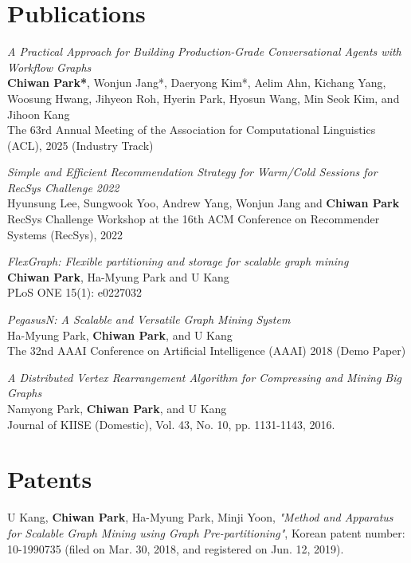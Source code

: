 \documentclass[11pt,a4paper]{article}
\renewenvironment{itemize}{
  \begin{list}{}{
    \setlength{\leftmargin}{1em}
    \setlength{\itemsep}{0.25em}
    \setlength{\parskip}{0pt}
    \setlength{\parsep}{0.25em}
  }
}{
  \end{list}
}
\begin{document}
\section*{Publications}
\begin{itemize}
  \item \textit{A Practical Approach for Building Production-Grade Conversational Agents with Workflow Graphs}\\
  \textbf{Chiwan Park*}, Wonjun Jang*, Daeryong Kim*, Aelim Ahn, Kichang Yang, Woosung Hwang, Jihyeon Roh, Hyerin Park, Hyosun Wang, Min Seok Kim, and Jihoon Kang\\
  The 63rd Annual Meeting of the Association for Computational Linguistics (ACL), 2025 (Industry Track)
  \item \textit{Simple and Efficient Recommendation Strategy for Warm/Cold Sessions for RecSys Challenge 2022}\\
  Hyunsung Lee, Sungwook Yoo, Andrew Yang, Wonjun Jang and \textbf{Chiwan Park}\\
  RecSys Challenge Workshop at the 16th ACM Conference on Recommender Systems (RecSys), 2022
  \item \textit{FlexGraph: Flexible partitioning and storage for scalable graph mining}\\
  \textbf{Chiwan Park}, Ha-Myung Park and U Kang\\
  PLoS ONE 15(1): e0227032
  \item \textit{PegasusN: A Scalable and Versatile Graph Mining System}\\
  Ha-Myung Park, \textbf{Chiwan Park}, and U Kang\\
  The 32nd AAAI Conference on Artificial Intelligence (AAAI) 2018 (Demo Paper)
  \item \textit{A Distributed Vertex Rearrangement Algorithm for Compressing and Mining Big Graphs}\\
  Namyong Park, \textbf{Chiwan Park}, and U Kang\\
  Journal of KIISE (Domestic), Vol. 43, No. 10, pp. 1131-1143, 2016.
\end{itemize}

\section*{Patents}
\begin{itemize}
  \item U Kang, \textbf{Chiwan Park}, Ha-Myung Park, Minji Yoon, \textit{"Method and Apparatus for Scalable Graph Mining using Graph Pre-partitioning"}, Korean patent number: 10-1990735 (filed on Mar. 30, 2018, and registered on Jun. 12, 2019).
\end{itemize}
\end{document}
